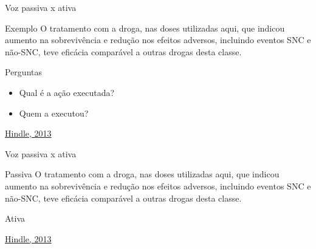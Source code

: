 \documentclass{beamer}
\begin{document}
\begin{frame}{Voz passiva x ativa}
  \begin{exampleblock}{Exemplo}
    \footnotesize
    O tratamento com a droga, nas doses utilizadas aqui, que
    \alert<2>{indicou aumento} na sobrevivência e redução nos
      efeitos adversos, incluindo eventos SNC e não-SNC,
      \alert<2>{teve eficácia} comparável a outras drogas desta
      classe.

  \end{exampleblock}
  \begin{block}{Perguntas}
    \begin{itemize}
      \footnotesize
    \item Qual é a ação executada? 
    \item Quem a executou?
    \end{itemize}
  \end{block}

  \vfill
  \scriptsize
  \hfill \href{https://web.archive.org/web/20150321052033/http://www.edanzediting.com/blog/reader_expectations_active_voice}
  {Hindle, 2013}
\end{frame}

\begin{frame}{Voz passiva x ativa}
  \begin{exampleblock}{Passiva}
    \scriptsize
    O tratamento com a droga, nas doses utilizadas aqui, que
    \alert{indicou aumento} na sobrevivência e redução nos efeitos adversos,
    incluindo eventos SNC e não-SNC, \alert{teve eficácia}
    comparável a outras drogas desta classe.

  \end{exampleblock}
  \begin{exampleblock}{Ativa}
    \small
  \end{exampleblock}

  \vfill
  \scriptsize
  \hfill \href{https://web.archive.org/web/20150321052033/http://www.edanzediting.com/blog/reader_expectations_active_voice}
  {Hindle, 2013}
\end{frame}
\end{document}
